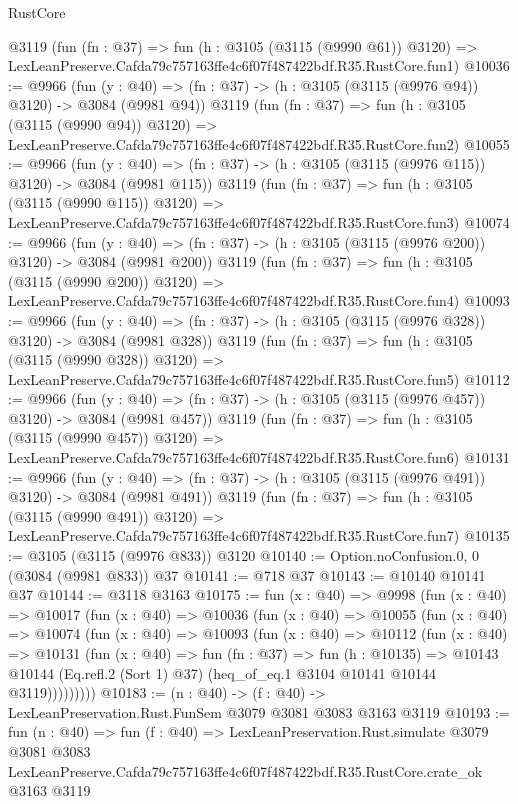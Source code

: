 \begin{lexlean}{RustCore}
\begin{coremodule}
    @3119
    (fun (fn : @37) =>
    fun (h : @3105 (@3115 (@9990 @61)) @3120) =>
    LexLeanPreserve.Cafda79c757163ffe4c6f07f487422bdf.R35.RustCore.fun1)
@10036 := @9966
    (fun (y : @40) => (fn : @37) -> (h : @3105 (@3115 (@9976 @94)) @3120) -> @3084 (@9981 @94))
    @3119
    (fun (fn : @37) =>
    fun (h : @3105 (@3115 (@9990 @94)) @3120) =>
    LexLeanPreserve.Cafda79c757163ffe4c6f07f487422bdf.R35.RustCore.fun2)
@10055 := @9966
    (fun (y : @40) => (fn : @37) -> (h : @3105 (@3115 (@9976 @115)) @3120) -> @3084 (@9981 @115))
    @3119
    (fun (fn : @37) =>
    fun (h : @3105 (@3115 (@9990 @115)) @3120) =>
    LexLeanPreserve.Cafda79c757163ffe4c6f07f487422bdf.R35.RustCore.fun3)
@10074 := @9966
    (fun (y : @40) => (fn : @37) -> (h : @3105 (@3115 (@9976 @200)) @3120) -> @3084 (@9981 @200))
    @3119
    (fun (fn : @37) =>
    fun (h : @3105 (@3115 (@9990 @200)) @3120) =>
    LexLeanPreserve.Cafda79c757163ffe4c6f07f487422bdf.R35.RustCore.fun4)
@10093 := @9966
    (fun (y : @40) => (fn : @37) -> (h : @3105 (@3115 (@9976 @328)) @3120) -> @3084 (@9981 @328))
    @3119
    (fun (fn : @37) =>
    fun (h : @3105 (@3115 (@9990 @328)) @3120) =>
    LexLeanPreserve.Cafda79c757163ffe4c6f07f487422bdf.R35.RustCore.fun5)
@10112 := @9966
    (fun (y : @40) => (fn : @37) -> (h : @3105 (@3115 (@9976 @457)) @3120) -> @3084 (@9981 @457))
    @3119
    (fun (fn : @37) =>
    fun (h : @3105 (@3115 (@9990 @457)) @3120) =>
    LexLeanPreserve.Cafda79c757163ffe4c6f07f487422bdf.R35.RustCore.fun6)
@10131 := @9966
    (fun (y : @40) => (fn : @37) -> (h : @3105 (@3115 (@9976 @491)) @3120) -> @3084 (@9981 @491))
    @3119
    (fun (fn : @37) =>
    fun (h : @3105 (@3115 (@9990 @491)) @3120) =>
    LexLeanPreserve.Cafda79c757163ffe4c6f07f487422bdf.R35.RustCore.fun7)
@10135 := @3105 (@3115 (@9976 @833)) @3120
@10140 := Option.noConfusion.{0, 0} (@3084 (@9981 @833)) @37
@10141 := @718 @37
@10143 := @10140 @10141 @37
@10144 := @3118 @3163
@10175 := fun (x : @40) =>
  @9998
    (fun (x : @40) =>
    @10017
      (fun (x : @40) =>
      @10036
        (fun (x : @40) =>
        @10055
          (fun (x : @40) =>
          @10074
            (fun (x : @40) =>
            @10093
              (fun (x : @40) =>
              @10112
                (fun (x : @40) =>
                @10131
                  (fun (x : @40) =>
                  fun (fn : @37) =>
                  fun (h : @10135) =>
                  @10143
                    @10144
                    (Eq.refl.{2} (Sort 1) @37)
                    (heq_of_eq.{1} @3104 @10141 @10144 @3119)))))))))
@10183 := (n : @40) -> (f : @40) -> LexLeanPreservation.Rust.FunSem @3079 @3081 @3083 @3163 @3119
@10193 := fun (n : @40) =>
  fun (f : @40) =>
  LexLeanPreservation.Rust.simulate
    @3079
    @3081
    @3083
    LexLeanPreserve.Cafda79c757163ffe4c6f07f487422bdf.R35.RustCore.crate_ok
    @3163
    @3119
\end{coremodule}
\end{lexlean}
